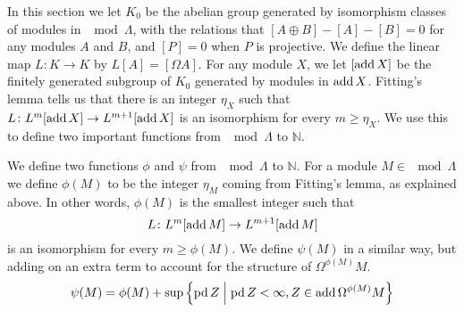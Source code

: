 In this section we let $K_0$ be the abelian group generated by isomorphism classes of modules in $\mod\Lambda$, with the relations that $[A\oplus B] - [A] - [B] = 0$ for any modules $A$ and $B$, and $[P]=0$ when $P$ is projective. We define the linear map $L\colon K\to K$ by $L[A] = [\Omega A]$. For any module $X$, we let $[\operatorname{add} X]$ be the finitely generated subgroup of $K_0$ generated by modules in $\operatorname{add} X$. Fitting's lemma tells us that there is an integer $\eta_X$ such that $L\colon L^m[\operatorname{add} X] \to L^{m+1}[\operatorname{add} X]$ is an isomorphism for every $m \geq \eta_X$. We use this to define two important functions from $\mod \Lambda$ to $\mathbb N$.

\begin{defn}
	We define two functions $\phi$ and $\psi$ from $\mod\Lambda$ to $\mathbb N$. For a module $M \in \mod\Lambda$ we define $\phi(M)$ to be the integer $\eta_M$ coming from Fitting's lemma, as explained above. In other words, $\phi(M)$ is the smallest integer such that $$L\colon L^m[\operatorname{add} M] \to L^{m+1}[\operatorname{add} M]$$ is an isomorphism for every $m \geq \phi(M)$. We define $\psi(M)$ in a similar way, but adding on an extra term to account for the structure of $\Omega^{\phi(M)}M$. 
	$$\psi(M) = \phi(M) + \sup\left\lbrace\operatorname{pd} Z \; \middle| \; \operatorname{pd} Z < \infty, Z \in \operatorname{add} \Omega^{\phi(M)}M\right\rbrace$$
\end{defn}


